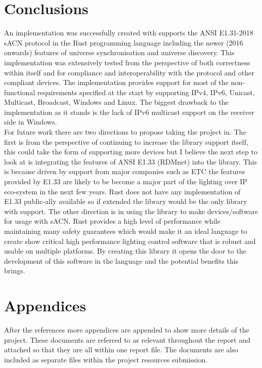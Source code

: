 \documentclass[11pt,a4paper]{article}
\begin{document}
\section{Conclusions}
An implementation was successfully created with supports the ANSI E1.31-2018 sACN protocol in the Rust programming language including the newer (2016 onwards) features of universe synchronisation and universe discovery. This implementation was extensively tested from the perspective of both correctness within itself and for compliance and interoperability with the protocol and other compliant devices. The implementation provides support for most of the non-functional requirements specified at the start by supporting IPv4, IPv6, Unicast, Multicast, Broadcast, Windows and Linux. The biggest drawback to the implementation as it stands is the lack of IPv6 multicast support on the receiver side in Windows. \\

For future work there are two directions to propose taking the project in. The first is from the perspective of continuing to increase the library support itself, this could take the form of supporting more devices but I believe the next step to look at is integrating the features of ANSI E1.33 (RDMnet) into the library. This is because driven by support from major companies such as ETC the features provided by E1.33 are likely to be become a major part of the lighting over IP eco-system in the next few years. Rust does not have any implementation of E1.33 public-ally available so if extended the library would be the only library with support. The other direction is in using the library to make devices/software for usage with sACN. Rust provides a high level of performance while maintaining many safety guarantees which would make it an ideal language to create show critical high performance lighting control software that is robust and usable on multiple platforms. By creating this library it opens the door to the development of this software in the language and the potential benefits this brings.

\section{Appendices}
After the references more appendices are appended to show more details of the project. These documents are referred to as relevant throughout the report and attached so that they are all within one report file. The documents are also included as separate files within the project resources submission.
\end{document}
